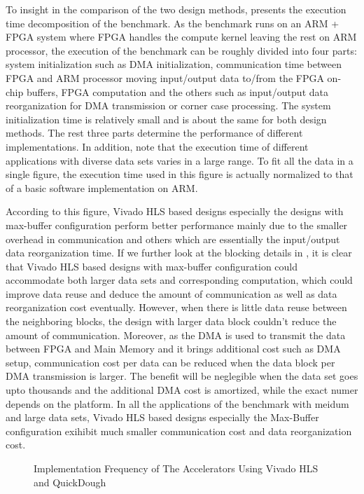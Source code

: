 To insight in the comparison of the two design methods,  presents the execution time decomposition of the benchmark. As the benchmark runs on an ARM + FPGA system where FPGA handles the compute kernel leaving the rest on ARM processor, the execution of the benchmark can be roughly divided into four parts: system initialization such as DMA initialization, communication time between FPGA and ARM processor moving input/output data to/from the FPGA on-chip buffers, FPGA computation and the others such as input/output data reorganization for DMA transmission or corner case processing. The system initialization time is relatively small and is about the same for both design methods. The rest three parts determine the performance of different implementations. In addition, note that the execution time of different applications with diverse data sets varies in a large range. To fit all the data in a single figure, the execution time used in this figure is actually normalized to that of a basic software implementation on ARM. 

According to this figure, Vivado HLS based designs especially the designs with max-buffer configuration perform better performance mainly due to the smaller overhead in communication and others which are essentially the input/output data reorganization time. If we further look at the blocking details in , it is clear that Vivado HLS based designs with max-buffer configuration could accommodate both larger data sets and corresponding computation, which could improve data reuse and deduce the amount of communication as well as data reorganization cost eventually. However, when there is little data reuse between the neighboring blocks, the design with larger data block couldn't reduce the amount of communication. Moreover, as the DMA is used to transmit the data between FPGA and Main Memory and it brings additional cost such as DMA setup, communication cost per data can be reduced when the data block per DMA transmission is larger. The benefit will be neglegible when the data set goes upto thousands and the additional DMA cost is amortized, while the exact numer depends on the platform. In all the applications of the benchmark with meidum and large data sets, Vivado HLS based designs especially the Max-Buffer configuration exihibit much smaller communication cost and data reorganization cost.

\begin{figure}[H]
\caption{Implementation Frequency of The Accelerators Using Vivado HLS and QuickDough}
\label{fig:execution-time}
\end{figure}

